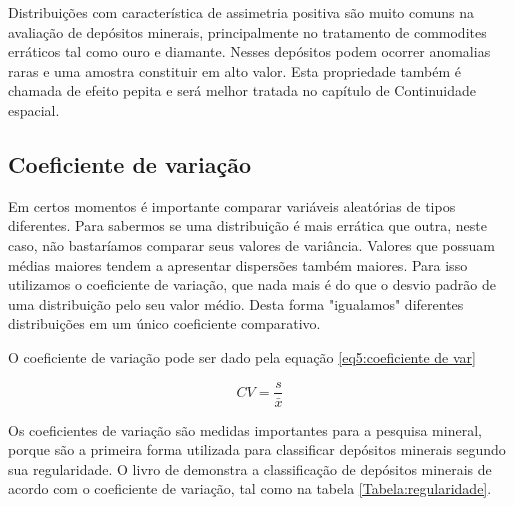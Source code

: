 Distribuições com característica de assimetria positiva são muito comuns na avaliação de depósitos minerais, principalmente no tratamento de commodites erráticos tal como ouro e diamante. Nesses depósitos podem ocorrer anomalias raras e uma amostra constituir em alto valor. Esta propriedade também é chamada de efeito pepita e será melhor tratada no capítulo de Continuidade espacial. 


\subsection{Coeficiente de variação}

Em certos momentos é importante comparar variáveis aleatórias de tipos diferentes. Para sabermos se uma distribuição é mais errática que outra, neste caso, não bastaríamos comparar seus valores de variância. Valores que possuam médias maiores tendem a apresentar dispersões também maiores. Para isso utilizamos o coeficiente de variação, que nada mais é do que o desvio padrão de uma distribuição pelo seu valor médio. Desta forma "igualamos" diferentes distribuições em um único coeficiente comparativo. 

O coeficiente de variação pode ser dado pela equação \eqref{eq5:coeficiente de var}

\begin{equation}\label{eq5:coeficiente de var}
CV = \frac{s}{\bar{x}}
\end{equation}

Os coeficientes de variação são medidas importantes para a pesquisa mineral, porque são a primeira forma utilizada para classificar depósitos minerais segundo sua regularidade. O livro de \citep{maranhao1985introduccao} demonstra a classificação de depósitos minerais de acordo com o coeficiente de variação, tal como na tabela \ref{Tabela:regularidade}.

\FloatBarrier
\begin{table}[!htb]
	\centering
	\caption{Regularidade dos depósitos minerais de acordo com a classificação do coeficiente de variação}
	\vspace{0.5cm}
	\label{Tabela:regularidade}
\end{table}
\FloatBarrier

